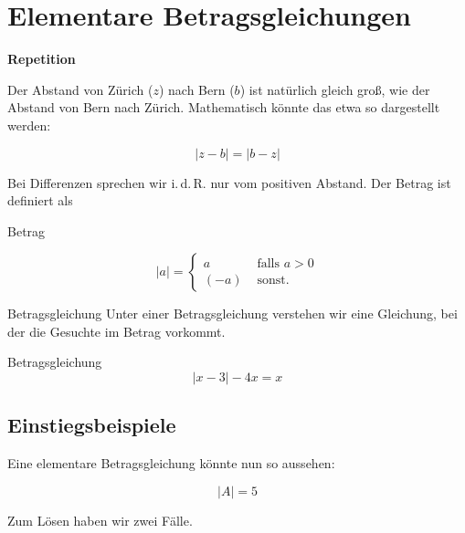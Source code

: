 \section{Elementare Betragsgleichungen}

\textbf{Repetition}

Der Abstand von Zürich ($z$)  nach Bern ($b$) ist natürlich gleich groß, wie der
Abstand von Bern nach Zürich. Mathematisch könnte das etwa so
dargestellt werden:

$$|z-b| = |b-z|$$

Bei Differenzen sprechen wir i.\,d.\,R. nur vom positiven Abstand. Der
Betrag ist definiert als

\begin{definition}{Betrag}{}

  $$|a| = \left\{  \begin{aligned} a & \text{ falls } a > 0 \\ (-a) &
    \text{ sonst. }  \end{aligned} \right.$$
\end{definition}


\begin{definition}{Betragsgleichung}{}
  Unter einer Betragsgleichung verstehen wir eine Gleichung, bei der
  die Gesuchte im Betrag vorkommt.
\end{definition}

\begin{beispiel}{Betragsgleichung}{}
  $$|x-3| - 4x = x$$
\end{beispiel}

\newpage
\subsection{Einstiegsbeispiele}
Eine elementare Betragsgleichung könnte nun so aussehen:

$$|A| = 5$$

Zum Lösen haben wir zwei Fälle.


